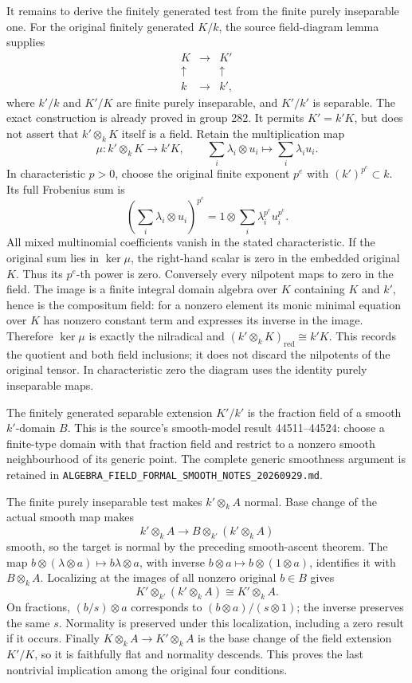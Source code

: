It remains to derive the finitely generated test from the finite purely inseparable one. For the original finitely generated \(K/k\), the source field-diagram lemma supplies \[
 \begin{matrix}K&\longrightarrow&K'\\ \uparrow&&\uparrow\\ k&\longrightarrow&k',\end{matrix}
\] where \(k'/k\) and \(K'/K\) are finite purely inseparable, and \(K'/k'\) is separable. The exact construction is already proved in group 282. It permits \(K'=k'K\), but does not assert that \(k'\otimes_kK\) itself is a field. Retain the multiplication map \[
 \mu:k'\otimes_kK\longrightarrow k'K,\qquad
 \sum_i\lambda_i\otimes u_i\longmapsto\sum_i\lambda_iu_i.
\] In characteristic \(p>0\), choose the original finite exponent \(p^e\) with \((k')^{p^e}\subset k\). Its full Frobenius sum is \[
 \left(\sum_i\lambda_i\otimes u_i\right)^{p^e}
 =1\otimes\sum_i\lambda_i^{p^e}u_i^{p^e}.
\] All mixed multinomial coefficients vanish in the stated characteristic. If the original sum lies in \(\ker\mu\), the right-hand scalar is zero in the embedded original \(K\). Thus its \(p^e\)-th power is zero. Conversely every nilpotent maps to zero in the field. The image is a finite integral domain algebra over \(K\) containing \(K\) and \(k'\), hence is the compositum field: for a nonzero element its monic minimal equation over \(K\) has nonzero constant term and expresses its inverse in the image. Therefore \(\ker\mu\) is exactly the nilradical and \((k'\otimes_kK)_{\mathrm{red}}\cong k'K\). This records the quotient and both field inclusions; it does not discard the nilpotents of the original tensor. In characteristic zero the diagram uses the identity purely inseparable maps.

The finitely generated separable extension \(K'/k'\) is the fraction field of a smooth \(k'\)-domain \(B\). This is the source's smooth-model result 44511--44524: choose a finite-type domain with that fraction field and restrict to a nonzero smooth neighbourhood of its generic point. The complete generic smoothness argument is retained in \texttt{ALGEBRA\_\allowbreak{}FIELD\_\allowbreak{}FORMAL\_\allowbreak{}SMOOTH\_\allowbreak{}NOTES\_\allowbreak{}20260929.\allowbreak{}md}.

The finite purely inseparable test makes \(k'\otimes_kA\) normal. Base change of the actual smooth map makes \[
 k'\otimes_kA\longrightarrow B\otimes_{k'}(k'\otimes_kA)
\] smooth, so the target is normal by the preceding smooth-ascent theorem. The map \(b\otimes(\lambda\otimes a)\mapsto b\lambda\otimes a\), with inverse \(b\otimes a\mapsto b\otimes(1\otimes a)\), identifies it with \(B\otimes_kA\). Localizing at the images of all nonzero original \(b\in B\) gives \[
 K'\otimes_{k'}(k'\otimes_kA)\cong K'\otimes_kA.
\] On fractions, \((b/s)\otimes a\) corresponds to \((b\otimes a)/(s\otimes1)\); the inverse preserves the same \(s\). Normality is preserved under this localization, including a zero result if it occurs. Finally \(K\otimes_kA\to K'\otimes_kA\) is the base change of the field extension \(K'/K\), so it is faithfully flat and normality descends. This proves the last nontrivial implication among the original four conditions.

